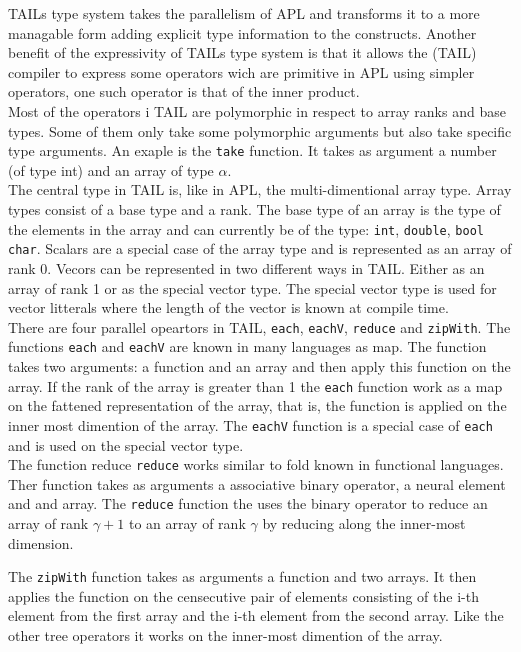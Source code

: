 \documentclass[11pt]{article}
\begin{document}
TAILs type system takes the parallelism of APL and transforms it to a more managable form adding explicit type
 information to the constructs. Another benefit of the expressivity of TAILs type system is that it allows the (TAIL) compiler to express some operators wich are primitive in APL using simpler operators, one such operator is that of the inner product. \\
 
Most of the operators i TAIL are polymorphic in respect to array ranks and base types. Some of them only take some
polymorphic arguments but also take specific type arguments. An exaple is the {\tt take} function. It takes as argument 
a number (of type int) and an array of type $\alpha$.\\

The central type in TAIL is, like in APL, the multi-dimentional array type. Array types consist of a base type and a rank. The base type of an array is the type of the elements in the array and can currently be of the type: {\tt int}, 
{\tt double}, {\tt bool} {\tt char}. 
Scalars are a special case of the array type and is represented as an array of rank 0. 
Vecors can be represented in two different ways in TAIL. Either as an array of rank 1 or as the special vector type. The special vector type is used for vector litterals where the length of the vector is known at compile time. \\


There are four parallel opeartors in TAIL, {\tt each}, {\tt eachV}, {\tt reduce} and {\tt zipWith}. The functions {\tt each} and
 {\tt eachV} are known in many languages as map. The function takes two arguments: a function and an array and then apply this function on the array. If the rank of the array is greater than 1 the {\tt each} function work as a map on the fattened representation of the array, that is, the function is applied on the inner most dimention of the array. The {\tt eachV} function is a special case of {\tt each} and is used on the special vector type.\\

The function reduce {\tt reduce} works similar to fold known in functional languages. Ther function takes as arguments 
a associative binary operator, a neural element and and array. The {\tt reduce} function the uses the binary operator 
to reduce an array of rank $\gamma+1$ to an array of rank $\gamma$ by reducing along the inner-most dimension. 


The {\tt zipWith} function takes as arguments a function and two arrays. It then applies the function on the censecutive pair of elements consisting of the i-th element from the first array and the i-th element from the second array. Like the
 other tree operators it works on the inner-most dimention of the array. \\
\end{document}
